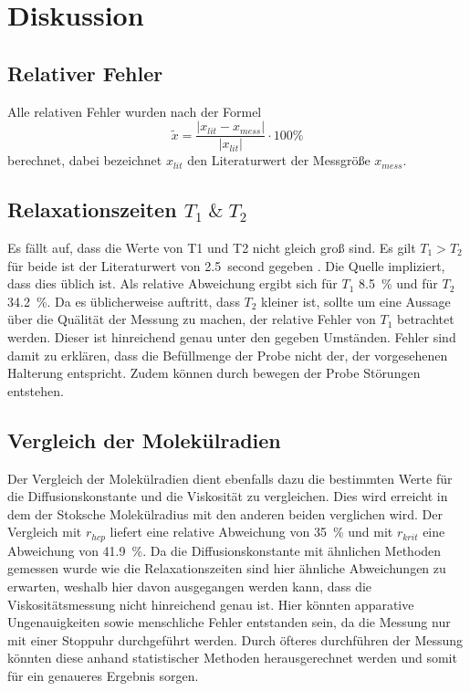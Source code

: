 \section{Diskussion}
\label{sec:Diskussion}
\subsection{Relativer Fehler}
Alle relativen Fehler wurden nach der Formel
\begin{equation*}
  \tilde{x} = \frac{ \lvert x_{lit} - x_{mess} \rvert}{\lvert x_{lit} \rvert}
  \cdot 100 \%
\end{equation*}
berechnet, dabei bezeichnet $x_{lit}$ den Literaturwert der Messgröße $x_{mess}$.
\subsection{Relaxationszeiten \texorpdfstring{$T_1 \; \& \; T_2$}{math}}
Es fällt auf, dass die Werte von T1 und T2 nicht gleich groß sind. Es gilt $T_1 > T_2$ für beide 
ist der Literaturwert von \SI{2,5}{second} gegeben \cite{hyper}. Die Quelle impliziert, dass dies üblich ist. Als 
relative Abweichung ergibt sich für $T_1$ \SI{8,5}{\percent} und für $T_2$ \SI{34,2}{\percent}. Da es üblicherweise auftritt, 
dass $T_2$ kleiner ist, sollte um eine Aussage über die Quälität der Messung zu machen, der relative Fehler von $T_1$ 
betrachtet werden. Dieser ist hinreichend genau unter den gegeben Umständen. Fehler sind damit zu erklären, dass die 
Befüllmenge der Probe nicht der, der vorgesehenen Halterung entspricht. Zudem können durch bewegen der Probe Störungen 
entstehen.
\subsection{Vergleich der Molekülradien}
Der Vergleich der Molekülradien dient ebenfalls dazu die bestimmten Werte für die Diffusionskonstante und 
die Viskosität zu vergleichen. Dies wird erreicht in dem der Stoksche Molekülradius mit den anderen beiden verglichen wird. 
Der Vergleich mit $r_{hcp}$ liefert eine relative Abweichung von \SI{35}{\percent} und mit $r_{krit}$ eine Abweichung von 
\SI{41,9}{\percent}. Da die Diffusionskonstante mit ähnlichen Methoden gemessen wurde wie die Relaxationszeiten sind hier 
ähnliche Abweichungen zu erwarten, weshalb hier davon ausgegangen werden kann, dass die Viskositätsmessung nicht 
hinreichend genau ist. Hier könnten apparative Ungenauigkeiten sowie menschliche Fehler entstanden sein, da die Messung 
nur mit einer Stoppuhr durchgeführt werden. Durch öfteres durchführen der Messung könnten diese anhand statistischer Methoden 
herausgerechnet werden und somit für ein genaueres Ergebnis sorgen.
